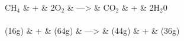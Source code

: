 \begin{dependency}[label style = {circle}]
\begin{deptext}
CH$_4$ \& + \& 2O$_2$ \& --->  \& CO$_2$ \& + \& 2H$_2$0 \\ \\
 (16g) \& + \& (64g) \& --->  \& (44g) \& + \& (36g) \\
\end{deptext}
\end{dependency}